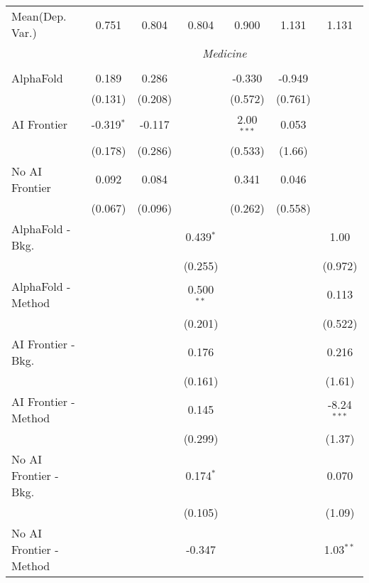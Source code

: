\begin{tabular}{lcccccc}
Mean(Dep. Var.) & 0.751 & 0.804 & 0.804 & 0.900 & 1.131 & 1.131 \\
 & \multicolumn{6}{c}{\textit{Medicine}} \\ \\
   AlphaFold               & 0.189        & 0.286   &              & -0.330       & -0.949  &   \\   
                           & (0.131)      & (0.208) &              & (0.572)      & (0.761) &   \\   
   AI Frontier             & -0.319$^{*}$ & -0.117  &              & 2.00$^{***}$ & 0.053   &   \\   
                           & (0.178)      & (0.286) &              & (0.533)      & (1.66)  &   \\   
   No AI Frontier          & 0.092        & 0.084   &              & 0.341        & 0.046   &   \\   
                           & (0.067)      & (0.096) &              & (0.262)      & (0.558) &   \\   
   AlphaFold - Bkg.        &              &         & 0.439$^{*}$  &              &         & 1.00\\   
                           &              &         & (0.255)      &              &         & (0.972)\\   
   AlphaFold - Method      &              &         & 0.500$^{**}$ &              &         & 0.113\\   
                           &              &         & (0.201)      &              &         & (0.522)\\   
   AI Frontier - Bkg.      &              &         & 0.176        &              &         & 0.216\\   
                           &              &         & (0.161)      &              &         & (1.61)\\   
   AI Frontier - Method    &              &         & 0.145        &              &         & -8.24$^{***}$\\   
                           &              &         & (0.299)      &              &         & (1.37)\\   
   No AI Frontier - Bkg.   &              &         & 0.174$^{*}$  &              &         & 0.070\\   
                           &              &         & (0.105)      &              &         & (1.09)\\   
   No AI Frontier - Method &              &         & -0.347       &              &         & 1.03$^{**}$\\   

\end{tabular}
